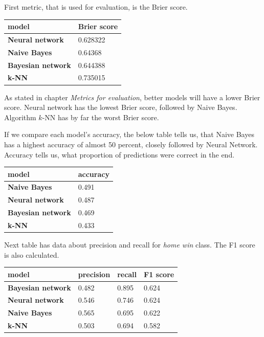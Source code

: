 \documentclass[conference]{IEEEtran}
\begin{document}
First metric, that is used for evaluation, is the Brier score. 

\begin{table}[!ht]
    \centering
    \begin{tabular}{ll}
        model & Brier score \\ \hline
        \textbf{Neural network} & 0.628322 \\ 
        \textbf{Naive Bayes} & 0.64368 \\ 
        \textbf{Bayesian network} & 0.644388 \\ 
        \textbf{k-NN} & 0.735015 \\ 
    \end{tabular}
\end{table}

As stated in chapter \textit{Metrics for evaluation}, better models will have a lower 
Brier score. Neural network has the lowest Brier score, followed by Naive Bayes. 
Algorithm $k$-NN has by far the worst Brier score.

If we compare each model's accuracy, the below table tells us, that Naive Bayes has a 
highest accuracy of almost 50 percent, closely followed by Neural Network. Accuracy tells
us, what proportion of predictions were correct in the end.

\begin{table}[!ht]
    \centering
    \begin{tabular}{ll}
        model & accuracy \\ \hline
        \textbf{Naive Bayes} & 0.491 \\ 
        \textbf{Neural network} & 0.487 \\ 
        \textbf{Bayesian network} & 0.469 \\ 
        \textbf{k-NN} & 0.433 \\ 
    \end{tabular}
\end{table}

Next table has data about precision and recall for \textit{home win} class. The F1 score is also
calculated.

\begin{table}[!ht]
    \centering
    \begin{tabular}{llll}
        model & precision & recall & F1 score \\ \hline
        \textbf{Bayesian network} & 0.482 & 0.895 & 0.624 \\ 
        \textbf{Neural network} & 0.546 & 0.746 & 0.624 \\ 
        \textbf{Naive Bayes} & 0.565 & 0.695 & 0.622 \\ 
        \textbf{k-NN} & 0.503 & 0.694 & 0.582 \\ 
    \end{tabular}
\end{table}
\end{document}

